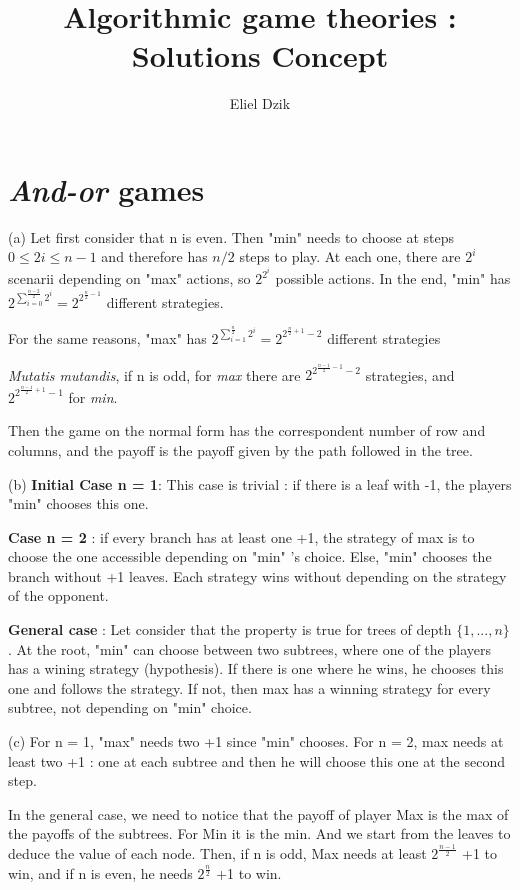 \documentclass[11pt, a4paper]{article}
\title{Algorithmic game theories : Solutions Concept}
\author{Eliel Dzik}
\begin{document}
\date{}
\maketitle

\section{\textit{And-or} games}
(a) Let first consider that n is even. Then "min" needs to choose at steps $0 \leq 2i \leq n-1$ and therefore has $ n/2$ steps to play. At each one, there are $2^i$ scenarii depending on "max" actions, so $ 2^{2^i}$ possible actions.
In the end, "min" has $2^{\sum_{i=0}^{\frac{n-2}{2}} 2^i} = 2^{2^{\frac{n}{2} -1 }}$ different strategies.


For the same reasons, "max" has $2^{\sum_{i=1}^{\frac{n}{2}} 2^i} = 2^{2^{\frac{n}{2} + 1 } - 2 }$ different strategies


\textit{Mutatis mutandis}, if n is odd,  for \textit{max} there are $2^{2^{\frac{n-1}{2} - 1 } - 2 }$ strategies, and $ 2^{2^{\frac{n-1}{2} + 1 }-1}$ for \textit{min}.

Then the game on the normal form has the correspondent number of row and columns, and the payoff is the payoff given by the path followed in the tree.
\newline

(b) \textbf{Initial Case n = 1}: This case is trivial : if there is a leaf with -1, the players "min" chooses this one.

\textbf{Case n = 2} : if every branch has at least one +1, the strategy of max is to choose the one accessible depending on "min" 's choice. Else, "min"  chooses the branch without +1 leaves. Each strategy wins without depending on the strategy of the opponent.

\textbf{General case} : Let consider that the property is true for trees of depth $\{1, ..., n\}$. At the root, "min" can choose between two subtrees, where one of the players has a wining  strategy (hypothesis). If there is one where he wins, he chooses this one and follows the strategy. If not, then max has a winning strategy for every subtree, not depending on "min" choice.
\newline

(c) For n = 1, "max" needs two  +1 since "min" chooses.
For n = 2, max needs at least two +1 : one at each subtree and then he will choose this one at the second step.

In the general case, we need to notice that the payoff of player Max is the max of the payoffs of the subtrees. 
For Min it is the min. And we start from the leaves to deduce the value of each node. 
Then, if n is odd, Max needs at least $2^{\frac{n-1}{2}}$ +1 to win, and if n is even, he needs $2^{\frac{n}{2}}$ +1 to win.
\end{document}
